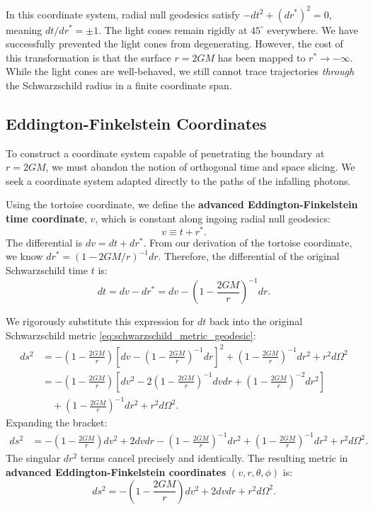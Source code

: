 \documentclass[11pt, a4paper]{report}
\begin{document}
In this coordinate system, radial null geodesics satisfy $-dt^{2} + (dr^{*})^{2} = 0$, meaning $dt/dr^{*} = \pm 1$. The light cones remain rigidly at $45^{\circ}$ everywhere. We have successfully prevented the light cones from degenerating. However, the cost of this transformation is that the surface $r = 2GM$ has been mapped to $r^{*} \to -\infty$. While the light cones are well-behaved, we still cannot trace trajectories \textit{through} the Schwarzschild radius in a finite coordinate span.

\subsection{Eddington-Finkelstein Coordinates}

To construct a coordinate system capable of penetrating the boundary at $r=2GM$, we must abandon the notion of orthogonal time and space slicing. We seek a coordinate system adapted directly to the paths of the infalling photons. 

Using the tortoise coordinate, we define the \textbf{advanced Eddington-Finkelstein time coordinate}, $v$, which is constant along ingoing radial null geodesics:
\begin{equation}
\label{eq:advanced_v}
v \equiv t + r^{*}.
\end{equation}
The differential is $dv = dt + dr^{*}$. From our derivation of the tortoise coordinate, we know $dr^{*} = (1 - 2GM/r)^{-1}dr$. Therefore, the differential of the original Schwarzschild time $t$ is:
\begin{equation}
dt = dv - dr^{*} = dv - \left( 1 - \frac{2GM}{r} \right)^{-1} dr.
\end{equation}

We rigorously substitute this expression for $dt$ back into the original Schwarzschild metric \eqref{eq:schwarzschild_metric_geodesic}:
\begin{align}
ds^{2} &= -\left( 1 - \frac{2GM}{r} \right) \left[ dv - \left( 1 - \frac{2GM}{r} \right)^{-1} dr \right]^{2} + \left( 1 - \frac{2GM}{r} \right)^{-1} dr^{2} + r^{2} d\Omega^{2} \nonumber \\
&= -\left( 1 - \frac{2GM}{r} \right) \left[ dv^{2} - 2\left( 1 - \frac{2GM}{r} \right)^{-1} dv dr + \left( 1 - \frac{2GM}{r} \right)^{-2} dr^{2} \right] \nonumber \\
&\quad + \left( 1 - \frac{2GM}{r} \right)^{-1} dr^{2} + r^{2} d\Omega^{2}.
\end{align}
Expanding the bracket:
\begin{align}
ds^{2} &= -\left( 1 - \frac{2GM}{r} \right)dv^{2} + 2 dv dr - \left( 1 - \frac{2GM}{r} \right)^{-1} dr^{2} + \left( 1 - \frac{2GM}{r} \right)^{-1} dr^{2} + r^{2} d\Omega^{2}.
\end{align}
The singular $dr^{2}$ terms cancel precisely and identically. The resulting metric in \textbf{advanced Eddington-Finkelstein coordinates} $(v, r, \theta, \phi)$ is:
\begin{equation}
\label{eq:eddington_metric}
ds^{2} = -\left( 1 - \frac{2GM}{r} \right)dv^{2} + 2 dv dr + r^{2} d\Omega^{2}.
\end{equation}
\end{document}
